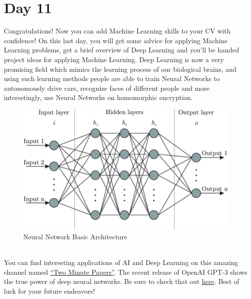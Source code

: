 \documentclass[11pt]{article}
\begin{document}
\section{Day 11}
Congratulations! Now you can add Machine Learning skills to your CV with confidence! On this last day, you will get some advice for applying Machine Learning problems, get a brief overview of Deep Learning and you'll be handed project ideas for applying Machine Learning. Deep Learning is now a very promising field which mimics the learning process of our biological brains, and using such learning methods people are able to train Neural Networks to autonomously drive cars, recognize faces of different people and more interestingly, use Neural Networks on homomorphic encryption.
\begin{figure}[h!]
\centering
\includegraphics[scale=.5]{img/nn.png}
{\caption*{Neural Network Basic Architecture}}
\end{figure}\\
You can find interesting applications of AI and Deep Learning on this amazing channel named \href{https://www.youtube.com/channel/UCbfYPyITQ-7l4upoX8nvctg}{``Two Minute Papers''}. The recent release of OpenAI GPT-3 shows the true power of deep neural networks. Be sure to check that out \href{https://www.youtube.com/watch?v=_x9AwxfjxvE}{here}. Best of luck for your future endeavors!
\end{document}
